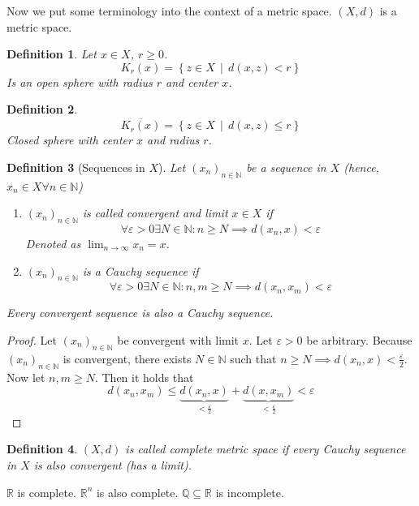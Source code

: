 \documentclass{article}
\newtheorem{definition}{Definition}  \numberwithin{definition}{section}
\newcommand{\setdef}[2]{\left\{\left.#1\,\middle|\,#2\right.\right\}}
\begin{document}
Now we put some terminology into the context of a metric space.
$(X, d)$ is a metric space.

\begin{definition}
  Let $x \in X$, $r \geq 0$.
  \[ K_r(x) = \setdef{z \in X}{d(x, z) < r} \]
  Is an \emph{open sphere} with radius $r$ and center $x$.
\end{definition}

\begin{definition}
  \[ \overline{K_r(x)} = \setdef{z \in X}{d(x, z) \leq r} \]
  Closed sphere with center $x$ and radius $r$.
\end{definition}

\begin{definition}[Sequences in $X$]
  Let $(x_n)_{n\in\mathbb N}$ be a sequence in $X$ (hence, $x_n \in X \forall n \in \mathbb N$)
  \begin{enumerate}
    \item $(x_n)_{n\in\mathbb N}$ is called \emph{convergent} and limit $x \in X$ if
      \[ \forall \varepsilon > 0 \exists N \in \mathbb N: n \geq N \implies d(x_n, x) < \varepsilon \]
      Denoted as $\lim_{n\to\infty} x_n = x$.
    \item $(x_n)_{n\in\mathbb N}$ is a Cauchy sequence if
      \[ \forall \varepsilon > 0 \exists N \in \mathbb N: n, m \geq N \implies d(x_n, x_m) < \varepsilon \]
  \end{enumerate}
  Every convergent sequence is also a Cauchy sequence.
\end{definition}

\begin{proof}
  Let $(x_n)_{n\in\mathbb N}$ be convergent with limit $x$. Let $\varepsilon > 0$ be arbitrary.
  Because $(x_n)_{n\in\mathbb N}$ is convergent, there exists $N \in \mathbb N$ such that $n \geq N \implies d(x_n, x) < \frac{\varepsilon}{2}$.
  Now let $n,m \geq N$. Then it holds that
  \[ d(x_n, x_m) \leq \underbrace{d(x_n, x)}_{< \frac{\varepsilon}2} + \underbrace{d(x, x_m)}_{< \frac\varepsilon2} < \varepsilon \]
\end{proof}

\begin{definition}
  $(X, d)$ is called \emph{complete metric space} if every Cauchy sequence in $X$ is also convergent (has a limit).
\end{definition}

$\mathbb R$ is complete. $\mathbb R^n$ is also complete. $\mathbb Q \subseteq \mathbb R$ is incomplete.
\end{document}
